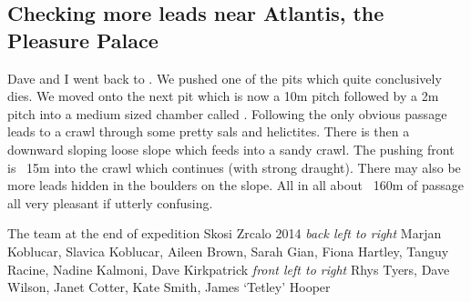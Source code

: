 \subsection{Checking more leads near Atlantis, the Pleasure Palace}
\label{sec:jericho}
Dave and I went back to . We pushed one of the pits which quite conclusively dies. We moved onto the next pit which is now a 10m pitch followed by a 2m pitch into a medium sized chamber called . Following the only obvious passage leads to  a crawl through some pretty sals and helictites. There is then a downward sloping loose slope which feeds into a sandy crawl. The pushing front is ~15m into the crawl which continues (with strong draught). There may also be more leads hidden in the boulders on the slope. All in all about ~160m of passage all very pleasant if utterly confusing. 

\begin{pagefigure}
\checkoddpage \ifoddpage \forcerectofloat \else \forceversofloat \fi
\centering
{}
\caption{The team at the end of expedition Skosi Zrcalo 2014  \emph{back left to right} Marjan Koblucar, Slavica Koblucar, Aileen Brown, Sarah Gian, Fiona Hartley, Tanguy Racine, Nadine Kalmoni, Dave Kirkpatrick \emph{front left to right} Rhys Tyers, Dave Wilson, Janet Cotter, Kate Smith, James `Tetley' Hooper}
\label{end of expo 2014}
\end{pagefigure}




